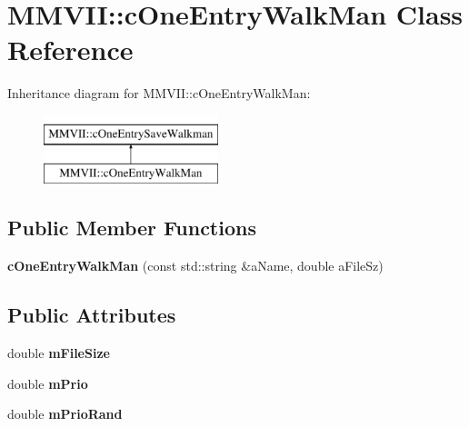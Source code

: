 \hypertarget{classMMVII_1_1cOneEntryWalkMan}{}\section{M\+M\+V\+II\+:\+:c\+One\+Entry\+Walk\+Man Class Reference}
\label{classMMVII_1_1cOneEntryWalkMan}
Inheritance diagram for M\+M\+V\+II\+:\+:c\+One\+Entry\+Walk\+Man\+:\begin{figure}[H]
\begin{center}
\leavevmode
\includegraphics[height=2.000000cm]{classMMVII_1_1cOneEntryWalkMan}
\end{center}
\end{figure}
\subsection*{Public Member Functions}
\begin{DoxyCompactItemize}
\item 
{\bfseries c\+One\+Entry\+Walk\+Man} (const std\+::string \&a\+Name, double a\+File\+Sz)\hypertarget{classMMVII_1_1cOneEntryWalkMan_a9afcef0f31a36bffd13caf9cdd003a07}{}\label{classMMVII_1_1cOneEntryWalkMan_a9afcef0f31a36bffd13caf9cdd003a07}

\end{DoxyCompactItemize}
\subsection*{Public Attributes}
\begin{DoxyCompactItemize}
\item 
double {\bfseries m\+File\+Size}\hypertarget{classMMVII_1_1cOneEntryWalkMan_a8674ce13dcb6a3dc507ad87a5bbe72d7}{}\label{classMMVII_1_1cOneEntryWalkMan_a8674ce13dcb6a3dc507ad87a5bbe72d7}

\item 
double {\bfseries m\+Prio}\hypertarget{classMMVII_1_1cOneEntryWalkMan_a6b2d16137c5a3f4144489cafff9d10a5}{}\label{classMMVII_1_1cOneEntryWalkMan_a6b2d16137c5a3f4144489cafff9d10a5}

\item 
double {\bfseries m\+Prio\+Rand}\hypertarget{classMMVII_1_1cOneEntryWalkMan_aabb2ce732a506d4e814b8ef3bb4366d6}{}\label{classMMVII_1_1cOneEntryWalkMan_aabb2ce732a506d4e814b8ef3bb4366d6}

\end{DoxyCompactItemize}


